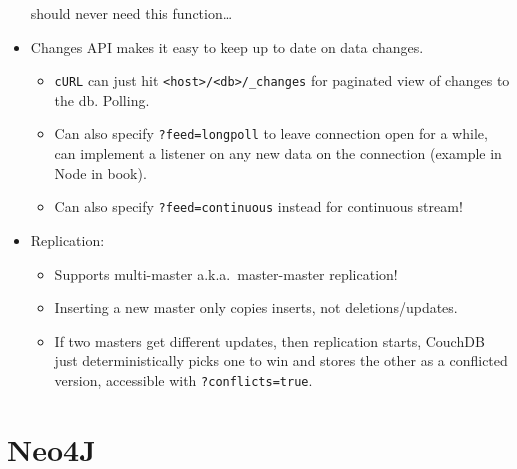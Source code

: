 \documentclass[10pt]{article}
\begin{document}
\begin{itemize}
        should never need this function\dots
    \item Changes API makes it easy to keep up to date on data changes.
        \begin{itemize}
            \item \lstinline{cURL} can just hit \lstinline{<host>/<db>/_changes}
                for paginated view of changes to the db. Polling.
            \item Can also specify \lstinline{?feed=longpoll} to leave
                connection open for a while, can implement a listener on any new
                data on the connection (example in Node in book).
            \item Can also specify \lstinline{?feed=continuous} instead for
                continuous stream!
        \end{itemize}
    \item Replication:
        \begin{itemize}
            \item Supports multi-master a.k.a.\ master-master replication!
            \item Inserting a new master only copies inserts, not
                deletions/updates.
            \item If two masters get different updates, then replication starts,
                CouchDB just deterministically picks one to win and stores the
                other as a conflicted version, accessible with
                \lstinline{?conflicts=true}.
        \end{itemize}
\end{itemize}

\section{Neo4J}
\end{document}
